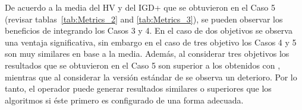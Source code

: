 De acuerdo a la media del HV y del IGD+ que se obtuvieron en el Caso 5 (revisar tablas~\ref{tab:Metrics_2} and \ref{tab:Metrics_3}), se pueden observar los beneficios de integrando los Casos 3 y 4.
%
En el caso de dos objetivos se observa una ventaja significativa, sin embargo en el caso de tres objetivo los Casos 4 y 5 son muy similares en base a la media.
%
Además, al considerar tres objetivos los resultados que se obtuvieron en el Caso 5 son superior a los obtenidos con \DE{}, mientras que al considerar la versión estándar de \SBX{} se observa un deterioro.
%
Por lo tanto, el operador \SBX{} puede generar resultados similares o superiores que los algoritmos \DEMO{} si éste primero es configurado de una forma adecuada.

